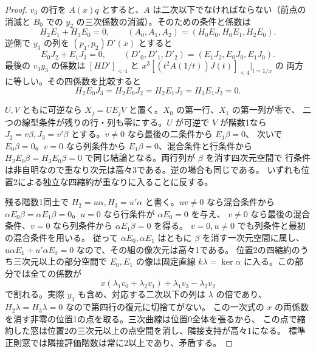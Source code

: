 \begin{proof}
$v_3$ の行を $A(x)q$ とすると、$A$ は二次以下でなければならない（前点の消滅と
$B_0$ での $y_2$ の三次係数の消滅）。そのための条件と係数は
\[
 H_2E_1+H_3E_0=0,\qquad (A_0,A_1,A_2)=(H_0E_0,H_0E_1,H_2E_0).
\]
逆側で $y_3$ の列を $(p_1,p_2)D'(x)$ とすると
\[
 E_0J_2+E_1J_3=0,\qquad (D'_0,D'_1,D'_2)=(E_1J_2,E_0J_0,E_1J_0).
\]
最後の $v_3y_3$ の係数は $[HD']_{<4}$ と $x^3[(t^2 A(1/t))J(t)]_{<4}|_{t=1/x}$ の
両方に等しい。その四係数を比較すると
\[
 H_2E_0J_3=H_2E_0J_2=H_2E_1J_2=H_3E_1J_2=0 .
\]

$U,V$ ともに可逆なら $X_j=UE_jV$ と置く。$X_0$ の第一行、$X_1$ の第一列が零で、
二つの線型条件が残りの行・列も零にする。$U$ が可逆で $V$ が階数1なら
$J_2=v\beta,J_3=v'\beta$ とする。$v\ne0$ なら最後の二条件から $E_1\beta=0$、
次いで $E_0\beta=0$。$v=0$ なら列条件から $E_1\beta=0$、混合条件と行条件から
$H_2E_0\beta=H_3E_0\beta=0$ で同じ結論となる。両行列が $\beta$ を消す四次元空間で
行条件は非自明なので重なり次元は高々3である。逆の場合も同じである。
いずれも位置2による独立な四縮約が重なりに入ることに反する。

残る階数1同士で $H_2=u\alpha,H_3=u'\alpha$ と書く。$uv\ne0$ なら混合条件から
$\alpha E_0\beta=\alpha E_1\beta=0$。$u=0$ なら行条件が $\alpha E_0=0$ を与え、
$v\ne0$ なら最後の混合条件、$v=0$ なら列条件から $\alpha E_1\beta=0$ を得る。
$v=0,u\ne0$ でも列条件と最初の混合条件を用いる。
従って $\alpha E_0,\alpha E_1$ はともに $\beta$ を消す一次元空間に属し、
$u\alpha E_1+u'\alpha E_0=0$ なので、その組の像次元は高々1である。
位置2の四縮約のうち三次元以上の部分空間で $E_0,E_1$ の像は固定直線
$k\lambda=\ker\alpha$ に入る。この部分では全ての係数が
\[
 x(\lambda_1v_0+\lambda_2v_1)+\lambda_1v_3-\lambda_2v_2
\]
で割れる。実際 $y_3$ も含め、対応する二次以下の列は $\lambda$ の倍であり、
$H_2\lambda=H_3\lambda=0$ なので第四行の復元に切捨てがない。
この一次式の $x$ の両係数を消す非零の位置1の点を取る。三次曲線は位置0全体を張るから、
この点で縮約した窓は位置2の三次元以上の点空間を消し、隣接支持が高々1になる。
標準正則窓では隣接評価階数は常に2以上であり、矛盾する。
\end{proof}

